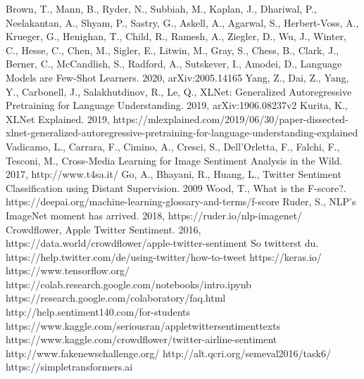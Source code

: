 \documentclass[12pt,german]{report}
\begin{document}
\begin{thebibliography}{}
 Brown, T., Mann, B., Ryder, N., Subbiah, M., Kaplan, J., Dhariwal, P., Neelakantan, A., Shyam, P., Sastry, G., Askell, A., Agarwal, S., Herbert-Voss, A., Krueger, G., Henighan, T., Child, R., Ramesh, A., Ziegler, D., Wu, J., Winter, C., Hesse, C., Chen, M., Sigler, E., Litwin, M., Gray, S., Chess, B., Clark, J., Berner, C., McCandlish, S., Radford, A., Sutskever, I., Amodei, D., Language Models are Few-Shot Learners. 2020,  arXiv:2005.14165 
 Yang, Z., Dai, Z., Yang, Y., Carbonell, J., Salakhutdinov, R., Le, Q., XLNet: Generalized Autoregressive Pretraining
for Language Understanding. 2019, arXiv:1906.08237v2
 Kurita, K., XLNet Explained. 2019,  https://mlexplained.com/2019/06/30/paper-dissected-xlnet-generalized-autoregressive-pretraining-for-language-understanding-explained
 Vadicamo, L., Carrara, F., Cimino, A., Cresci, S., Dell'Orletta, F., Falchi, F., Tesconi, M., Cross-Media Learning for Image Sentiment Analysis in the Wild. 2017, http://www.t4sa.it/
 Go, A., Bhayani, R., Huang, L., Twitter Sentiment Classification using Distant Supervision. 2009
 Wood, T., What is the F-score?. https://deepai.org/machine-learning-glossary-and-terms/f-score
 Ruder, S., NLP's ImageNet moment has arrived. 2018, https://ruder.io/nlp-imagenet/
 Crowdflower, Apple Twitter Sentiment. 2016, https://data.world/crowdflower/apple-twitter-sentiment
 So twitterst du. https://help.twitter.com/de/using-twitter/how-to-tweet
 https://keras.io/
 https://www.tensorflow.org/
 https://colab.research.google.com/notebooks/intro.ipynb
 https://research.google.com/colaboratory/faq.html
 http://help.sentiment140.com/for-students
 https://www.kaggle.com/seriousran/appletwittersentimenttexts
 https://www.kaggle.com/crowdflower/twitter-airline-sentiment
 http://www.fakenewschallenge.org/
 http://alt.qcri.org/semeval2016/task6/
 https://simpletransformers.ai

\end{thebibliography}
\end{document}
